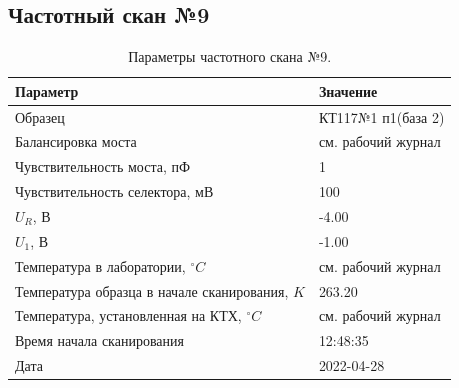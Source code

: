 \subsection{Частотный скан №9}
\begin{table}[!ht]
    \centering
    \caption{Параметры частотного скана №9.}
    \begin{tabular}{|l|l|}
        \hline
        Параметр                                       & Значение                  \\ \hline
        Образец                                        & КТ117№1 п1(база 2)        \\ \hline
        Балансировка моста                             & см. рабочий журнал        \\ \hline
        Чувствительность моста, пФ                     & 1                         \\ \hline
        Чувствительность селектора, мВ                 & 100                       \\ \hline
        $U_R$, В                                       & -4.00                     \\ \hline
        $U_1$, В                                       & -1.00                     \\ \hline
        Температура в лаборатории, $^\circ C$          & см. рабочий журнал        \\ \hline
        Температура образца в начале сканирования, $K$ & 263.20                    \\ \hline
        Температура, установленная на КТХ, $^\circ C$  & см. рабочий журнал        \\ \hline
        Время начала сканирования                      & 12:48:35                  \\ \hline
        Дата                                           & 2022-04-28                \\ \hline
    \end{tabular}
    \label{table:frequency_scan_9}
\end{table}

